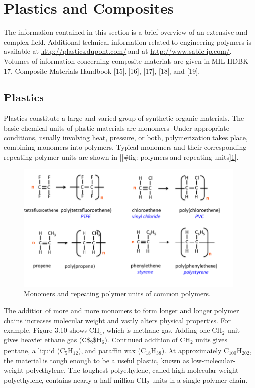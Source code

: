 \documentclass[a4paper,openany,12pt]{book}
\begin{document}
\section{Plastics and Composites}
\label{plastics-and-composites}
The information contained in this section is a brief overview of an
extensive and complex field. Additional technical information related to
engineering polymers is available at \url{http://plastics.dupont.com/} and
at \url{http://www.sabic-ip.com/}. Volumes of information concerning
composite materials are given in MIL-HDBK 17, Composite Materials
Handbook [15], [16], [17], [18], and [19].

\subsection{Plastics}
\label{plastics}
Plastics constitute a large and varied group of synthetic organic
materials. The basic chemical units of plastic materials are monomers.
Under appropriate conditions, usually involving heat, pressure, or both,
polymerization takes place, combining monomers into polymers. Typical
monomers and their corresponding repeating polymer units are shown in
[[\#fig: polymers and repeating units]\ref{fig: polymers and repeating units}].


\cite{secondaryscience4all}
\begin{figure}[htbp]
\centering
\includegraphics[width=.9\linewidth]{pictures/Material-selection/polymer.png}
\caption{\label{fig: polymers and repeating units}
Monomers and repeating polymer units of common polymers.}
\end{figure}

The addition of more and more monomers to form longer and longer polymer
chains increases molecular weight and vastly alters physical properties.
For example, Figure 3.10 shows \(\text{CH}_4\), which is methane gas.
Adding one \(\text{CH}_2\) unit gives heavier ethane gas (C\$\textsubscript{2}\$H\(_6\)).
Continued addition of \(\text{CH}_2\) units gives pentane, a liquid
(\(\text{C}_5\text{H}_{12}\)), and paraffin wax
(\(\text{C}_{18}\text{H}_{38}\)). At approximately
\(\text{C}_{100}\text{H}_{202}\), the material is tough enough to be a
useful plastic, known as low-molecular-weight polyethylene. The toughest
polyethylene, called high-molecular-weight polyethylene, contains nearly
a half-million \(\text{CH}_2\) units in a single polymer chain.
\end{document}
